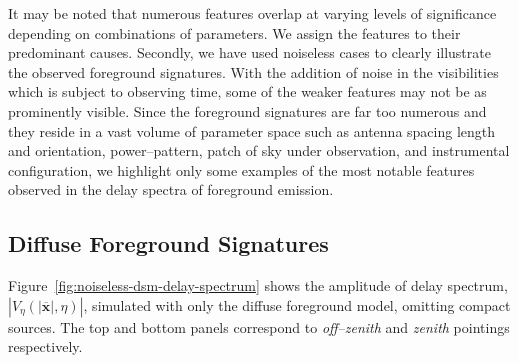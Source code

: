 \documentclass[preprint2,iop,numberedappendix]{emulateapj}
\begin{document}
\begin{itemize}

\end{itemize}

It may be noted that numerous features overlap at varying levels of significance depending on combinations of parameters. We assign the features to their predominant causes. Secondly, we have used noiseless cases to clearly illustrate the observed foreground signatures. With the addition of noise in the visibilities which is subject to observing time, some of the weaker features may not be as prominently visible. Since the foreground signatures are far too numerous and they reside in a vast volume of parameter space such as antenna spacing length and orientation, power--pattern, patch of sky under observation, and instrumental configuration, we highlight only some examples of the most notable features observed in the delay spectra of foreground emission.

\subsection{Diffuse Foreground Signatures}\label{sec:diffuse}

Figure~\ref{fig:noiseless-dsm-delay-spectrum} shows the amplitude of delay spectrum, $|V_\eta(|\overline{\mathbf{x}}|,\eta)|$, simulated with only the diffuse foreground model, omitting compact sources. The top and bottom panels correspond to {\it off--zenith} and {\it zenith} pointings respectively. 
\end{document}
